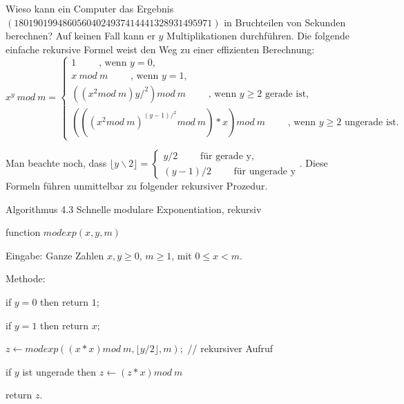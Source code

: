 \documentclass[a4paper]{article}
\begin{document}
\begin{multicols}{3}
    Wieso kann ein Computer das Ergebnis $(18019019948605604024937414441328931495971)$ in Bruchteilen von Sekunden berechnen? Auf keinen Fall kann er $y$ Multiplikationen durchführen. Die folgende einfache rekursive Formel weist den Weg zu einer effizienten Berechnung:
    $$x^y\ mod\ m=\begin{cases} 1\quad\quad\text{ , wenn } y=0,\\ x\ mod\ m\quad\quad\text{ , wenn } y= 1,\\ ((x^2 mod\ m)y/^2 ) mod\ m\quad\quad\text{ , wenn } y\geq 2 \text{ gerade ist},\\ (((x^2 mod\ m)^{(y-1)/^2} mod\ m)*x) mod\ m\quad\quad\text{ , wenn } y\geq 2 \text{ ungerade ist}.\end{cases}$$

    Man beachte noch, dass $\lfloor y\backslash 2\rfloor=\begin{cases} y/2\quad\quad\text{ für gerade y},\\ (y-1)/2\quad\quad\text{ für ungerade y}\end{cases}$. Diese Formeln führen unmittelbar zu folgender rekursiver Prozedur.

    Algorithmus 4.3 Schnelle modulare Exponentiation, rekursiv
    \begin{itemize*}
        \item function $modexp(x,y,m)$
        \item Eingabe: Ganze Zahlen $x,y\geq 0$, $m\geq 1$, mit $0\leq x < m$.
        \item Methode:
        \item if $y= 0$ then return $1$;
        \item if $y= 1$ then return $x$;
        \item $z\leftarrow modexp((x*x) mod\ m,\lfloor y/2\rfloor,m);$ // rekursiver Aufruf
        \item if $y$ ist ungerade then $z\leftarrow (z*x) mod\ m$
        \item return $z$.
    \end{itemize*}


\end{multicols}
\end{document}
